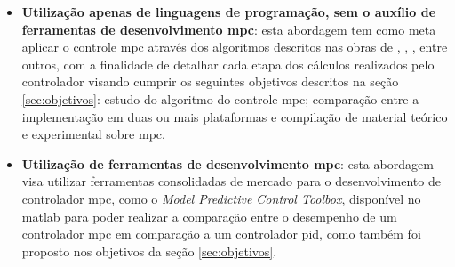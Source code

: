 \begin{itemize}
    \item \textbf{Utilização apenas de linguagens de programação, sem o auxílio de ferramentas de desenvolvimento
        \acrshort{mpc}}: esta abordagem tem como meta aplicar o controle \acrshort{mpc} através dos algoritmos
        descritos nas obras de , , ,
        entre outros, com a finalidade de detalhar cada etapa dos cálculos realizados pelo controlador
        visando cumprir os seguintes objetivos descritos na seção \ref{sec:objetivos}: estudo do algoritmo do
        controle \acrshort{mpc}; comparação entre a implementação em duas ou mais plataformas e compilação
        de material teórico e experimental sobre \acrshort{mpc}.
    \item \textbf{Utilização de ferramentas de desenvolvimento \acrshort{mpc}}: esta abordagem visa utilizar
        ferramentas consolidadas de mercado para o desenvolvimento de controlador \acrshort{mpc}, como o
        \textit{Model Predictive Control Toolbox}, disponível no \acrshort{matlab} para poder realizar
        a comparação entre o desempenho de um controlador \acrshort{mpc} em comparação a um controlador
        \acrshort{pid}, como também foi proposto nos objetivos da seção \ref{sec:objetivos}.
\end{itemize}